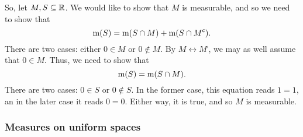 \begin{exm}
So, let $M,S\subseteq \mathbb{R}$.  We would like to show that $M$ is measurable, and so we need to show that
\begin{equation}
\mathrm{m} (S)=\mathrm{m} (S\cap M)+\mathrm{m} (S\cap M^{\mathsf{c}}).
\end{equation}
There are two cases:  either $0\in M$ or $0\notin M$.  By $M\leftrightarrow M^{\comp}$, we may as well assume that $0\in M$.  Thus, we need to show that
\begin{equation}
\mathrm{m} (S)=\mathrm{m} (S\cap M).
\end{equation}
There are two cases:  $0\in S$ or $0\notin S$.  In the former case, this equation reads $1=1$, an in the later case it reads $0=0$.  Either way, it is true, and so $M$ is measurable.
\end{exm}

\subsubsection{Measures on uniform spaces}

